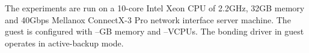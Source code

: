 
The experiments are run on a 10-core Intel Xeon CPU
of 2.2GHz, 32GB memory and 40Gbps Mellanox ConnectX-3
Pro network interface server machine. The guest is
configured with --GB memory and --VCPUs. The bonding
driver in guest operates in active-backup mode.

